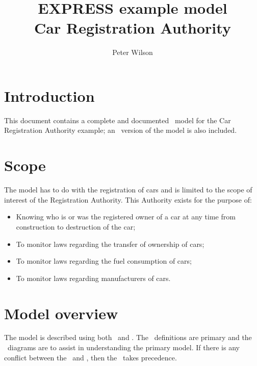 \documentclass{article}
\title{EXPRESS example model \\ Car Registration Authority}
\author{Peter Wilson}
\date{}
\begin{document}
\maketitle

\tableofcontents
\listoffigures
\clearpage



\makeatletter \@topnum\z@ \makeatother
\section{Introduction}

 This document contains a complete and documented \Express\ model for the
Car Registration Authority example; an \ExpressG\ version of the model is also 
included. 

\section{Scope}

The model has to do with the registration of cars and is limited to the scope
of interest of the Registration Authority. This Authority exists for the
purpose of:

\begin{itemize}

\item Knowing who is or was the registered owner of a car at any time from
construction to destruction of the car;

\item To monitor laws regarding the transfer of ownership of cars;

\item To monitor laws regarding the fuel consumption of cars;

\item To monitor laws regarding manufacturers of cars.

\end{itemize}

\section{Model overview}

    The model is described using both \Express\ and \ExpressG. The \Express\ 
definitions are primary and the \ExpressG\ diagrams are to assist in 
understanding the primary model. If there is any conflict between the 
\Express\ and \ExpressG, then the \Express\ takes precedence.
\end{document}
